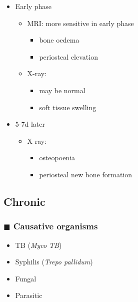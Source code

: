\documentclass[
  12pt,
]{memoir}
\providecommand{\tightlist}{%
  \setlength{\itemsep}{0pt}\setlength{\parskip}{0pt}}
\begin{document}
\begin{itemize}
\tightlist
\item
  Early phase

  \begin{itemize}
  \tightlist
  \item
    MRI: more sensitive in early phase

    \begin{itemize}
    \tightlist
    \item
      bone oedema
    \item
      periosteal elevation
    \end{itemize}
  \item
    X-ray:

    \begin{itemize}
    \tightlist
    \item
      may be normal
    \item
      soft tissue swelling
    \end{itemize}
  \end{itemize}
\item
  5-7d later

  \begin{itemize}
  \tightlist
  \item
    X-ray:

    \begin{itemize}
    \tightlist
    \item
      osteopoenia
    \item
      periosteal new bone formation
    \end{itemize}
  \end{itemize}
\end{itemize}

\hypertarget{chronic}{%
\subsection{Chronic}\label{chronic}}

\hypertarget{blacksquare-causative-organisms-1}{%
\subsubsection{\texorpdfstring{\(\blacksquare\) Causative
organisms}{\textbackslash blacksquare Causative organisms}}\label{blacksquare-causative-organisms-1}}

\begin{itemize}
\tightlist
\item
  TB (\emph{Myco TB})
\item
  Syphilis (\emph{Trepo pallidum})
\item
  Fungal
\item
  Parasitic
\end{itemize}
\end{document}
